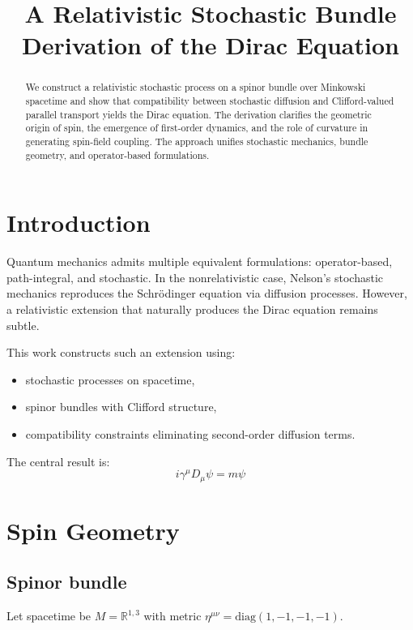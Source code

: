 \documentclass[11pt]{article}
\title{A Relativistic Stochastic Bundle Derivation of the Dirac Equation}
\author{}
\date{}
\begin{document}
\maketitle

\begin{abstract}
We construct a relativistic stochastic process on a spinor bundle over 
    Minkowski spacetime and show that compatibility between stochastic diffusion 
    and Clifford-valued parallel transport yields the Dirac equation. The derivation
    clarifies the geometric origin of spin, the emergence of first-order dynamics, 
    and the role of curvature in generating spin-field coupling. The approach unifies 
    stochastic mechanics, bundle geometry, and operator-based formulations.
\end{abstract}

\tableofcontents

\section{Introduction}

Quantum mechanics admits multiple equivalent formulations: operator-based, 
path-integral, and stochastic. In the nonrelativistic case, Nelson's 
stochastic mechanics reproduces the Schr\"odinger equation via diffusion processes.
However, a relativistic extension that naturally produces 
the Dirac equation remains subtle.

This work constructs such an extension using:
\begin{itemize}
\item stochastic processes on spacetime,
\item spinor bundles with Clifford structure,
\item compatibility constraints eliminating second-order diffusion terms.
\end{itemize}

The central result is:
\[
i \gamma^\mu D_\mu \psi = m \psi
\]

\section{Spin Geometry}

\subsection{Spinor bundle}

Let spacetime be $M = \mathbb{R}^{1,3}$ with metric 
$\eta^{\mu\nu} = \mathrm{diag}(1,-1,-1,-1)$.
\end{document}

